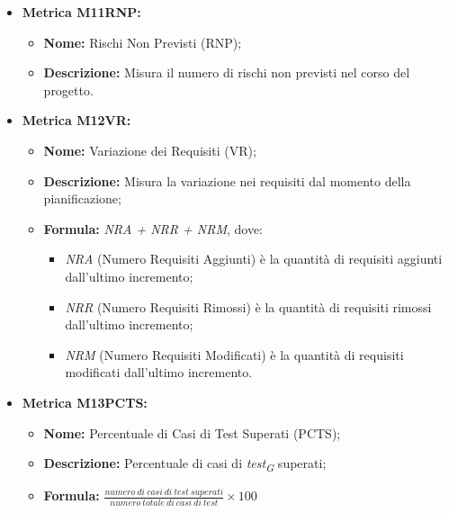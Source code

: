 \begin{itemize}
    \vspace{0.4cm}
    \item \hypertarget{item:M11RNP}{\textbf{Metrica M11RNP:}}
    \vspace{0.2cm}

    \begin{minipage}[H]{0.9\textwidth}
        \begin{itemize}
            \item \textbf{Nome:} Rischi Non Previsti (RNP);
            \item \textbf{Descrizione:} Misura il numero di rischi non previsti nel corso del progetto.
        \end{itemize}
    \end{minipage}

    \pagebreak
    \item \hypertarget{item:M12VR}{\textbf{Metrica M12VR:}}
    \vspace{0.2cm}

    \begin{minipage}[H]{0.8\textwidth}
        \begin{itemize}
            \item \textbf{Nome:} Variazione dei Requisiti (VR);
            \item \textbf{Descrizione:} Misura la variazione nei requisiti dal momento della pianificazione;
            \item \textbf{Formula:} \textit{NRA + NRR + NRM}, dove:\begin{itemize}
            \item \textit{NRA} (Numero Requisiti Aggiunti) è la quantità di requisiti aggiunti dall'ultimo incremento;
            \item \textit{NRR} (Numero Requisiti Rimossi) è la quantità di requisiti rimossi dall'ultimo incremento;
            \item \textit{NRM} (Numero Requisiti Modificati) è la quantità di requisiti modificati dall'ultimo incremento.
            \end{itemize}
        \end{itemize}
    \end{minipage}
    
    \vspace{0.4cm}
    \item \hypertarget{item:M13PCTS}{\textbf{Metrica M13PCTS:}}
    \vspace{0.2cm}
    
    \begin{minipage}[H]{0.9\textwidth}
        \begin{itemize}
            \item \textbf{Nome:} Percentuale di Casi di Test Superati (PCTS);
            \item \textbf{Descrizione:} Percentuale di casi di \textit{test}\textsubscript{\textit{G}} superati;
            \item \textbf{Formula:} $\frac{numero \ di \ casi \ di \ test \ superati}{numero \ totale \ di \ casi \ di \ test}\times 100$
        \end{itemize}
    \end{minipage}


\end{itemize}

